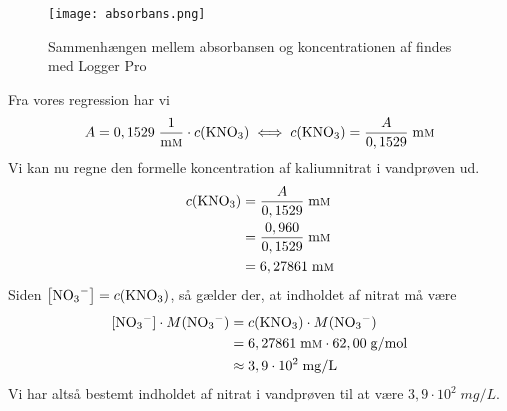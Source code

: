 \documentclass{report}
\begin{document}
\begin{figure}[H]
\begin{center}
  \texttt{[image: absorbans.png]}
\end{center}
\caption{Sammenhængen mellem absorbansen og koncentrationen af  findes med Logger Pro}
\label{fig:absorbans}
\end{figure}
Fra vores regression har vi
\[
A=0,1529 \;\unit{\frac{1}{m \textsc{m}}} \cdot c(\ce{KNO3} )\iff c(\ce{KNO3} )=\frac{A}{0,1529}\;\unit{m \textsc{m}} 
\] 
Vi kan nu regne den formelle koncentration af kaliumnitrat i vandprøven ud.
\begin{equation*}
\begin{split}
  c(\ce{KNO3} )&=\frac{A}{0,1529}\;\unit{m \textsc{m}} \\
  &=\frac{0,960}{0,1529} \;\unit{m \textsc{m}} \\
  &=6,27861 \;\unit{m \textsc{m}} 
\end{split}
\end{equation*}
Siden $\left[\ce{NO3-} \right]=c(\ce{KNO3} )$, så gælder der, at indholdet af nitrat må være
\begin{equation*}
\begin{split}
  [\ce{NO3-} ] \cdot M(\ce{NO3-} ) &= c(\ce{KNO3} ) \cdot M (\ce{NO3-} ) \\
  &=6,27861 \;\unit{m \textsc{m}} \cdot 62,00 \;\unit{g/mol} \\
  &\approx 3,9 \cdot 10^2 \;\unit{mg/L} 
\end{split}
\end{equation*}
Vi har altså bestemt indholdet af nitrat i vandprøven til at være $3,9 \cdot 10^2 \;\unit{mg/L} $.
\end{document}
